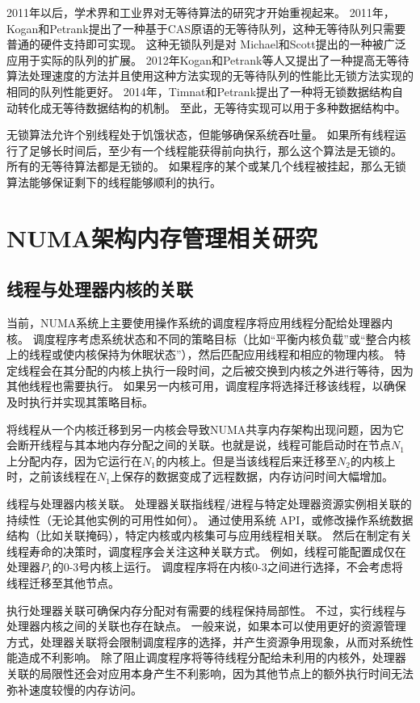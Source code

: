 2011年以后，学术界和工业界对无等待算法的研究才开始重视起来。
2011年，Kogan和Petrank提出了一种基于CAS原语的无等待队列\cite{kogan2011wait}，这种无等待队列只需要普通的硬件支持即可实现。
这种无锁队列是对 Michael和Scott\cite{michael1996simple}提出的一种被广泛应用于实际的队列的扩展。
2012年Kogan和Petrank\cite{kogan2012methodology}等人又提出了一种提高无等待算法处理速度的方法并且使用这种方法实现的无等待队列的性能比无锁方法实现的相同的队列性能更好。
2014年，Timnat和Petrank\cite{timnat2014practical}提出了一种将无锁数据结构自动转化成无等待数据结构的机制。
至此，无等待实现可以用于多种数据结构中。

无锁算法允许个别线程处于饥饿状态，但能够确保系统吞吐量。
如果所有线程运行了足够长时间后，至少有一个线程能获得前向执行，那么这个算法是无锁的。
所有的无等待算法都是无锁的。
如果程序的某个或某几个线程被挂起，那么无锁算法能够保证剩下的线程能够顺利的执行。

\section{NUMA架构内存管理相关研究}

\subsection{线程与处理器内核的关联}
当前，NUMA系统上主要使用操作系统的调度程序将应用线程分配给处理器内核。 调度程序考虑系统状态和不同的策略目标（比如“平衡内核负载”或“整合内核上的线程或使内核保持为休眠状态”），然后匹配应用线程和相应的物理内核。 特定线程会在其分配的内核上执行一段时间，之后被交换到内核之外进行等待，因为其他线程也需要执行。 如果另一内核可用，调度程序将选择迁移该线程，以确保及时执行并实现其策略目标。

将线程从一个内核迁移到另一内核会导致NUMA共享内存架构出现问题，因为它会断开线程与其本地内存分配之间的关联。也就是说，线程可能启动时在节点$N_1$上分配内存，因为它运行在$N_1$的内核上。但是当该线程后来迁移至$N_2$的内核上时，之前该线程在$N_1$上保存的数据变成了远程数据，内存访问时间大幅增加。

线程与处理器内核关联。 
处理器关联指线程/进程与特定处理器资源实例相关联的持续性（无论其他实例的可用性如何）。 
通过使用系统 API，或修改操作系统数据结构（比如关联掩码），特定内核或内核集可与应用线程相关联。 然后在制定有关线程寿命的决策时，调度程序会关注这种关联方式。 
例如，线程可能配置成仅在处理器$P_1$的0-3号内核上运行。 
调度程序将在内核0-3之间进行选择，不会考虑将线程迁移至其他节点。

执行处理器关联可确保内存分配对有需要的线程保持局部性。 
不过，实行线程与处理器内核之间的关联也存在缺点。 一般来说，如果本可以使用更好的资源管理方式，处理器关联将会限制调度程序的选择，并产生资源争用现象，从而对系统性能造成不利影响。 
除了阻止调度程序将等待线程分配给未利用的内核外，处理器关联的局限性还会对应用本身产生不利影响，因为其他节点上的额外执行时间无法弥补速度较慢的内存访问。

